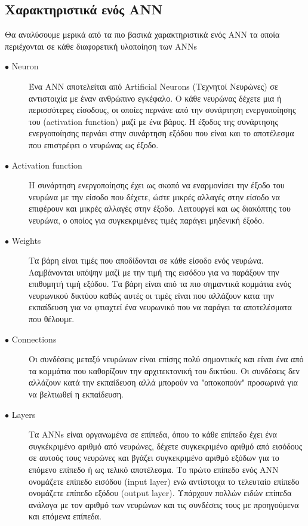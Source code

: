 \subsection{Χαρακτηριστικά ενός ANN}
Θα αναλύσουμε μερικά από τα πιο βασικά χαρακτηριστικά ενός ANN τα οποία περιέχονται σε κάθε διαφορετική υλοποίηση των ANNs

\begin{description}

\item[$\bullet$ Neuron] Ένα ANN αποτελείται από Artificial Neurons (Τεχνητοί Νευρώνες) σε αντιστοιχία με έναν ανθρώπινο εγκέφαλο. Ο κάθε νευρώνας δέχετε μια ή περισσότερες είσοδους, οι οποίες περνάνε από την συνάρτηση ενεργοποίησης του (activation function) μαζί με ένα βάρος. Η έξοδος της συνάρτησης ενεργοποίησης περνάει στην συνάρτηση εξόδου που είναι και το αποτέλεσμα που επιστρέφει ο νευρώνας ως έξοδο.

\item[$\bullet$ Activation function] Η συνάρτηση ενεργοποίησης έχει ως σκοπό να εναρμονίσει την έξοδο του νευρώνα με την είσοδο που δέχετε, ώστε μικρές αλλαγές στην είσοδο να επιφέρουν και μικρές αλλαγές στην έξοδο. Λειτουργεί και ως διακόπτης του νευρώνα, ο οποίος για συγκεκριμένες τιμές παράγει μηδενική έξοδο.

\item[$\bullet$ Weights] Τα βάρη είναι τιμές που αποδίδονται σε κάθε είσοδο ενός νευρώνα. Λαμβάνονται υπόψην μαζί με την τιμή της εισόδου για να παράξουν την επιθυμητή τιμή εξόδου. Τα βάρη είναι από τα πιο σημαντικά κομμάτια ενός νευρωνικού δικτύου καθώς αυτές οι τιμές είναι που αλλάζουν κατα την εκπαίδευση για να φτιαχτεί ένα νευρωνικό που να παράγει τα αποτελέσματα που θέλουμε.

\item[$\bullet$ Connections] Οι συνδέσεις μεταξύ νευρώνων είναι επίσης πολύ σημαντικές και είναι ένα από τα κομμάτια που καθορίζουν την αρχιτεκτονική του δικτύου. Οι συνδέσεις δεν αλλάζουν κατά την εκπαίδευση αλλά μπορούν να "αποκοπούν" προσωρινά για να βελτιωθεί η εκπαίδευση.

\item[$\bullet$ Layers] Τα ANNs είναι οργανωμένα σε επίπεδα, όπου το κάθε επίπεδο έχει ένα συγκέκριμένο αριθμό από νευρώνες, δέχετε συγκεκριμένο αριθμό από εισόδους σε αυτούς τους νευρώνες και βγάζει συγκεκριμένο αριθμό εξόδων για το επόμενο επίπεδο ή ως τελικό αποτέλεσμα. Το πρώτο επίπεδο ενός ANN ονομάζετε επίπεδο εισόδου (input layer) ενώ αντίστοιχα το τελευταίο επίπεδο ονομάζετε επίπεδο εξόδου (output layer). Υπάρχουν πολλών ειδών επίπεδα ανάλογα με τον αριθμό των νευρώνων και τις συνδέσεις τους με προηγούμενα και επόμενα επίπεδα. 

\end{description}


